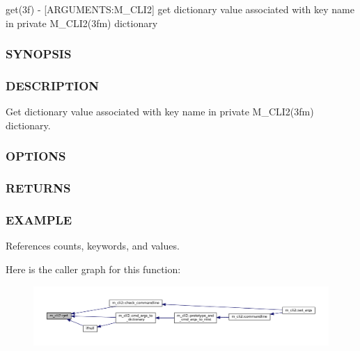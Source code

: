 get(3f) -\/ \mbox{[}A\+R\+G\+U\+M\+E\+N\+TS\+:M\+\_\+\+C\+L\+I2\mbox{]} get dictionary value associated with key name in private M\+\_\+\+C\+L\+I2(3fm) dictionary \subsubsection*{S\+Y\+N\+O\+P\+S\+IS}

\subsubsection*{D\+E\+S\+C\+R\+I\+P\+T\+I\+ON}

Get dictionary value associated with key name in private M\+\_\+\+C\+L\+I2(3fm) dictionary. \subsubsection*{O\+P\+T\+I\+O\+NS}

\subsubsection*{R\+E\+T\+U\+R\+NS}

\subsubsection*{E\+X\+A\+M\+P\+LE}

References counts, keywords, and values.

Here is the caller graph for this function\+:\nopagebreak
\begin{figure}[H]
\begin{center}
\leavevmode
\includegraphics[width=350pt]{namespacem__cli2_aa92e8ad0300d4e324e29eae1ab9d04b4_icgraph}
\end{center}
\end{figure}
\mbox{\label{namespacem__cli2_a448e8e24406f4bdbc14f26a940cbbc2c}} 
